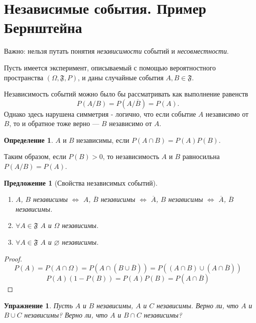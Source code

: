 \documentclass[11pt,openany,a4paper]{scrartcl}
\theoremstyle{plain}
\newtheorem{proposition}[theorem]{Предложение}
\newtheorem{exercise}[theorem]{Упражнение}
\theoremstyle{definition}
\newtheorem{definition}[theorem]{Определение}
\begin{document}
\section{Независимые события. Пример Бернштейна}

Важно: нельзя путать понятия \emph{независимости} событий и \emph{несовместности}.

Пусть имеется эксперимент, описываемый с помощью вероятностного пространства
$(\Omega, \mathfrak{F}, P)$, и даны случайные события $A, B \in \mathfrak{F}$.

Независимость событий можно было бы рассматривать как выполнение равенств
$$
P(A/B) = P(A/\overline{B}) = P(A).
$$
Однако здесь нарушена симметрия - логично, что если событие $A$ независимо от $B$, то
и обратное тоже верно — $B$ независимо от $A$.

\begin{definition}
    $A$ и $B$ независимы, если $P(A\cap B) = P(A)P(B)$.
\end{definition}

Таким образом, если $P(B) > 0$, то независимость $A$ и $B$ равносильна
$P(A/B) = P(A)$.
\begin{proposition}[Свойства независимых событий]
    \begin{enumerate}
        \item $A$, $B$ независимы $\iff$ $A$, $\overline{B}$ независимы
        $\iff$ $\overline{A}$, $B$ независимы $\iff$ $\overline{A}$, $\overline{B}$ 
        независимы.
        \item $\forall A \in \mathfrak{F}$ $A$ и $\Omega$ независимы.
        \item $\forall A \in \mathfrak{F}$ $A$ и $\varnothing$ независимы.
    \end{enumerate}
\end{proposition}
\begin{proof}
    $$
    P(A) = P(A\cap \Omega) = P(A \cap (B \cup \overline{B})) =
    P((A \cap B) \cup (A \cap \overline{B}))
    $$
    $$
    P(A)(1 - P(B)) = P(A)P(B) = P(A \cap \overline{B})
    $$
\end{proof}
\begin{exercise}
    Пусть $A$ и $B$ независимы, $A$ и $C$ независимы. Верно ли, что $A$ и $B \cup C$
    независимы? Верно ли, что $A$ и $B \cap C$ независимы?
\end{exercise}
\end{document}
